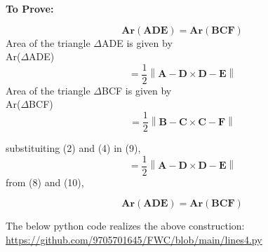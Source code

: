 \documentclass[10pt,a4paper]{report}
\let\vec\mathbf
\providecommand{\norm}[1]{\left\lVert#1\right\rVert}
\let\vec\mathbf
\begin{document}
\begin{multicols}{2}
\textbf{To Prove:} 
  \begin{center}
  \begin{equation}
      \vec{Ar(ADE)=Ar(BCF)}
  \end{equation}
 \vspace{3mm}
 Area of the triangle $\Delta$ADE is given by \\
 Ar($\Delta$ADE) 
\begin{equation} 
 = \frac{1}{2}\norm{\vec{A-D}\times\vec{D-E}}
\end{equation}
 \vspace{3mm}
  Area of the triangle $\Delta$BCF is given by \\
  Ar($\Delta$BCF)
   \begin{equation}
   =\frac{1}{2}\norm{\vec{B-C}\times\vec{C-F}}
   \end{equation}
 \end{center}
 substituiting (2) and (4) in (9),
 \begin{equation}
   =\frac{1}{2}\norm{\vec{A-D}\times\vec{D-E}}
   \end{equation}
   from (8) and (10),
 \begin{center}
\begin{equation}
    \vec{Ar(ADE)=Ar(BCF)}
\end{equation}
\end{center}
The below python code realizes the above construction: \\
\url{https://github.com/9705701645/FWC/blob/main/lines4.py}

\end{multicols}
\end{document}
